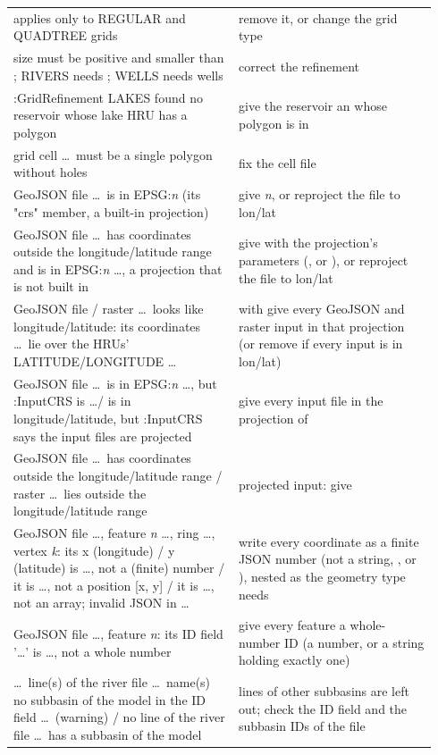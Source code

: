 \begin{longtable}{P{0.5\linewidth}P{0.44\linewidth}}
 applies only to REGULAR and QUADTREE grids & remove it, or change the grid type\\
 size must be positive and smaller than ; RIVERS needs ; WELLS needs wells & correct the refinement\\
:GridRefinement LAKES found no reservoir whose lake HRU has a polygon & give the reservoir an  whose polygon is in \\
grid cell \dots\ must be a single polygon without holes & fix the cell file\\
GeoJSON file \dots\ is in EPSG:\emph{n} (its "crs" member, a built-in projection) & give \emph{n}, or reproject the file to lon/lat\\
GeoJSON file \dots\ has coordinates outside the longitude/latitude range and is in EPSG:\emph{n} \dots, a projection that is not built in & give  with the projection's parameters (,  or ), or reproject the file to lon/lat\\
GeoJSON file / raster \dots\ looks like longitude/latitude: its coordinates \dots\ lie over the HRUs' LATITUDE/LONGITUDE \dots & with  give every GeoJSON and raster input in that projection (or remove  if every input is in lon/lat)\\
GeoJSON file \dots\ is in EPSG:\emph{n} \dots, but :InputCRS is \dots / is in longitude/latitude, but :InputCRS says the input files are projected & give every input file in the projection of \\
GeoJSON file \dots\ has coordinates outside the longitude/latitude range / raster \dots\ lies outside the longitude/latitude range & projected input: give \\
GeoJSON file \dots, feature \emph{n} \dots, ring \dots, vertex \emph{k}: its x (longitude) / y (latitude) is \dots, not a (finite) number / it is \dots, not a position [x, y] / it is \dots, not an array; invalid JSON in \dots & write every coordinate as a finite JSON number (not a string, ,  or ), nested as the geometry type needs\\
GeoJSON file \dots, feature \emph{n}: its ID field '\dots' is \dots, not a whole number & give every feature a whole-number ID (a number, or a string holding exactly one)\\
\dots\ line(s) of the river file \dots\ name(s) no subbasin of the model in the ID field \dots\ (warning) / no line of the river file \dots\ has a subbasin of the model & lines of other subbasins are left out; check the ID field and the subbasin IDs of the  file\\

\end{longtable}
